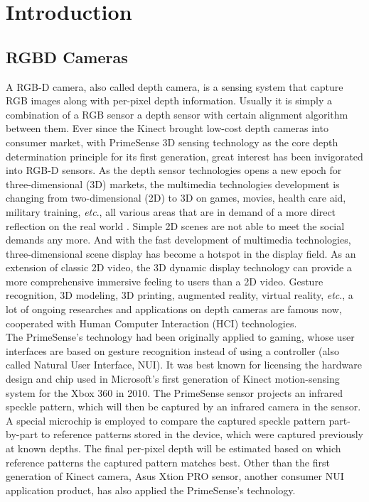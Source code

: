 \chapter{Introduction} %
\section{RGBD Cameras}
\indent
A RGB-D camera, also called depth camera, is a sensing system that capture RGB images along with per-pixel depth information. Usually it is simply a combination of a RGB sensor a depth sensor with certain alignment algorithm between them. Ever since the Kinect brought low-cost depth cameras into consumer market, with PrimeSense 3D sensing technology as the core depth determination principle for its first generation, great interest has been invigorated into RGB-D sensors. As the depth sensor technologies opens a new epoch for three-dimensional (3D) markets, the multimedia technologies development is changing from two-dimensional (2D) to 3D on games, movies, health care aid, military training, \textit{etc}., all various areas that are in demand of a more direct reflection on the real world \cite{depthOverview12}. Simple 2D scenes are not able to meet the social demands any more. And with the fast development of multimedia technologies, three-dimensional scene display has become a hotspot in the display field. As an extension of classic 2D video, the 3D dynamic display technology can provide a more comprehensive immersive feeling to users than a 2D video. Gesture recognition, 3D modeling, 3D printing, augmented reality, virtual reality, \textit{etc}., a lot of ongoing researches and applications on depth cameras are famous now, cooperated with Human Computer Interaction (HCI) technologies. %
\\\indent%
The PrimeSense's technology had been originally applied to gaming, whose user interfaces are based on gesture recognition instead of using a controller (also called Natural User Interface, NUI). It was best known for licensing the hardware design and chip used in Microsoft's first generation of Kinect motion-sensing system for the Xbox 360 in 2010. The PrimeSense sensor projects an infrared speckle pattern, which will then be captured by an infrared camera in the sensor. A special microchip is employed to compare the captured speckle pattern part-by-part to reference patterns stored in the device, which were captured previously at known depths. The final per-pixel depth will be estimated based on which reference patterns the captured pattern matches best. Other than the first generation of Kinect camera, Asus Xtion PRO sensor, another consumer NUI application product, has also applied the PrimeSense's technology.

